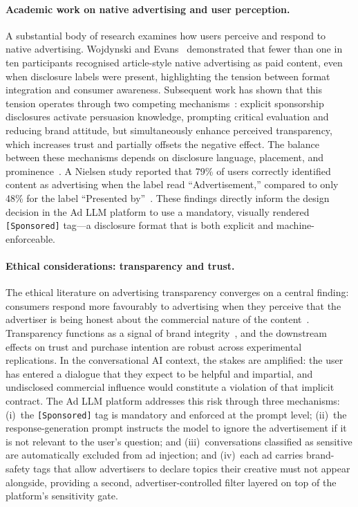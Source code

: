 \paragraph{Academic work on native advertising and user perception.}
A substantial body of research examines how users perceive and respond
to native advertising. Wojdynski and Evans~\cite{wojdynski2016native}
demonstrated that fewer than one in ten participants recognised
article-style native advertising as paid content, even when disclosure
labels were present, highlighting the tension between format
integration and consumer awareness. Subsequent work has shown that
this tension operates through two competing
mechanisms~\cite{vandam2022disclosure}: explicit sponsorship
disclosures activate persuasion knowledge, prompting critical
evaluation and reducing brand attitude, but simultaneously enhance
perceived transparency, which increases trust and partially offsets
the negative effect. The balance between these mechanisms depends on
disclosure language, placement, and
prominence~\cite{wojdynski2016native, campbell2018disclosure}. A
Nielsen study reported that 79\% of users correctly identified content
as advertising when the label read ``Advertisement,'' compared to only
48\% for the label ``Presented
by''~\cite{nielsen2014nativead}. These findings directly inform the
design decision in the Ad LLM platform to use a mandatory, visually
rendered \texttt{[Sponsored]} tag---a disclosure format that is both
explicit and machine-enforceable.

\paragraph{Ethical considerations: transparency and trust.}
The ethical literature on advertising transparency converges on a
central finding: consumers respond more favourably to advertising when
they perceive that the advertiser is being honest about the commercial
nature of the content~\cite{carr2014disclosure, campbell2018disclosure}.
Transparency functions as a signal of brand
integrity~\cite{kang2019transparency}, and the downstream effects on
trust and purchase intention are robust across experimental
replications. In the conversational AI context, the stakes are
amplified: the user has entered a dialogue that they expect to be
helpful and impartial, and undisclosed commercial influence would
constitute a violation of that implicit contract. The Ad LLM platform
addresses this risk through three mechanisms: (i)~the
\texttt{[Sponsored]} tag is mandatory and enforced at the prompt
level; (ii)~the response-generation prompt instructs the model to
ignore the advertisement if it is not relevant to the user's question;
and (iii)~conversations classified as sensitive are automatically excluded 
from ad injection; and (iv)~each ad carries brand-safety tags that allow 
advertisers to declare topics their creative must not appear alongside, 
providing a second, advertiser-controlled filter layered on top of the 
platform's sensitivity gate.

